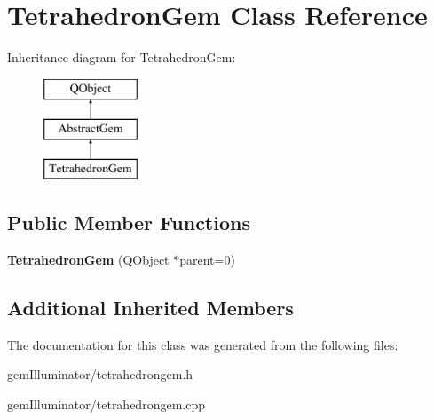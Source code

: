 \hypertarget{class_tetrahedron_gem}{}\section{Tetrahedron\+Gem Class Reference}
\label{class_tetrahedron_gem}
Inheritance diagram for Tetrahedron\+Gem\+:\begin{figure}[H]
\begin{center}
\leavevmode
\includegraphics[height=3.000000cm]{class_tetrahedron_gem}
\end{center}
\end{figure}
\subsection*{Public Member Functions}
\begin{DoxyCompactItemize}
\item 
\hypertarget{class_tetrahedron_gem_af942fcb0a4da9b3dfcf989931b2bc393}{}{\bfseries Tetrahedron\+Gem} (Q\+Object $\ast$parent=0)\label{class_tetrahedron_gem_af942fcb0a4da9b3dfcf989931b2bc393}

\end{DoxyCompactItemize}
\subsection*{Additional Inherited Members}


The documentation for this class was generated from the following files\+:\begin{DoxyCompactItemize}
\item 
gem\+Illuminator/tetrahedrongem.\+h\item 
gem\+Illuminator/tetrahedrongem.\+cpp\end{DoxyCompactItemize}
